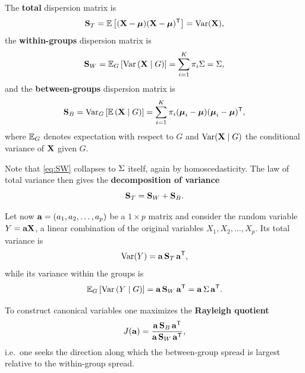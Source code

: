 \begin{definition}
  \label{def:dispersion_matrices}
  The \textbf{total} dispersion matrix is
  \begin{equation}
    \label{eq:ST}
    \mathbf{S}_T=\mathbb{E}\left[ (\mathbf{X}-\boldsymbol{\mu})(\mathbf{X}-\boldsymbol{\mu})^{\mathsf{T}} \right]=\operatorname{Var}(\mathbf{X}),
  \end{equation}
  the \textbf{within-groups} dispersion matrix is
  \begin{equation}
    \label{eq:SW}
    \mathbf{S}_W=\mathbb{E}_G\left[ \operatorname{Var}\left( \mathbf{X}\mid G \right) \right]
      =\sum_{i=1}^{K}\pi_i\Sigma=\Sigma,
  \end{equation}
  and the \textbf{between-groups} dispersion matrix is
  \begin{equation}
    \label{eq:SB}
    \mathbf{S}_B=\operatorname{Var}_G\left[ \mathbb{E}\left( \mathbf{X}\mid G \right) \right]
      =\sum_{i=1}^{K}\pi_i(\boldsymbol{\mu}_i-\boldsymbol{\mu})(\boldsymbol{\mu}_i-\boldsymbol{\mu})^{\mathsf{T}},
  \end{equation}
  where $\mathbb{E}_G$ denotes expectation with respect to $G$ and
  $\operatorname{Var}(\mathbf{X}\mid G)$ the conditional variance of $\mathbf{X}$ given $G$.
\end{definition}

Note that \eqref{eq:SW} collapses to $\Sigma$ itself, again by homoscedasticity.
The law of total variance then gives the \textbf{decomposition of variance}
\begin{equation}
  \label{eq:variance_decomposition}
  \mathbf{S}_T=\mathbf{S}_W+\mathbf{S}_B .
\end{equation}

Let now $\mathbf{a}=(a_1,a_2,\dots,a_p)$ be a $1\times p$ matrix and consider the
random variable $Y=\mathbf{a}\mathbf{X}$, a linear combination of the original
variables $X_1,X_2,\dots,X_p$. Its total variance is
\begin{equation}
  \label{eq:var_Y_total}
  \operatorname{Var}(Y)=\mathbf{a}\,\mathbf{S}_T\,\mathbf{a}^{\mathsf{T}},
\end{equation}
while its variance within the groups is
\begin{equation}
  \label{eq:var_Y_within}
  \mathbb{E}_G\left[ \operatorname{Var}\left( Y\mid G \right) \right]
    =\mathbf{a}\,\mathbf{S}_W\,\mathbf{a}^{\mathsf{T}}=\mathbf{a}\,\Sigma\,\mathbf{a}^{\mathsf{T}} .
\end{equation}

To construct canonical variables one maximizes the \textbf{Rayleigh quotient}
\begin{equation}
  \label{eq:rayleigh_lda}
  J(\mathbf{a})=\frac{\mathbf{a}\,\mathbf{S}_B\,\mathbf{a}^{\mathsf{T}}}
                 {\mathbf{a}\,\mathbf{S}_W\,\mathbf{a}^{\mathsf{T}}},
\end{equation}
i.e.\ one seeks the direction along which the between-group spread is largest
relative to the within-group spread.

